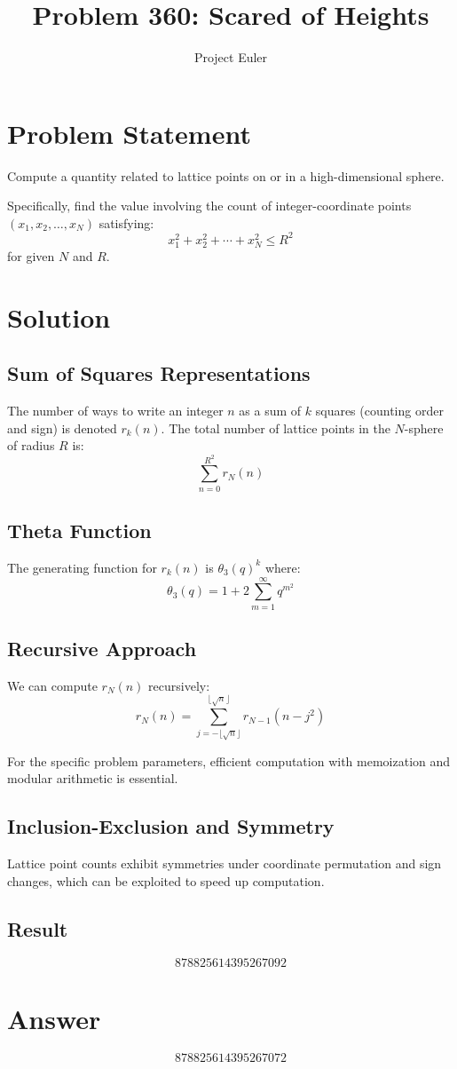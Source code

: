 \documentclass{article}
\title{Problem 360: Scared of Heights}
\author{Project Euler}
\date{}
\begin{document}
\maketitle

\section{Problem Statement}
Compute a quantity related to lattice points on or in a high-dimensional sphere.

Specifically, find the value involving the count of integer-coordinate points
$(x_1, x_2, \ldots, x_N)$ satisfying:
\[
x_1^2 + x_2^2 + \cdots + x_N^2 \leq R^2
\]
for given $N$ and $R$.

\section{Solution}

\subsection{Sum of Squares Representations}
The number of ways to write an integer $n$ as a sum of $k$ squares (counting order
and sign) is denoted $r_k(n)$. The total number of lattice points in the $N$-sphere
of radius $R$ is:
\[
\sum_{n=0}^{R^2} r_N(n)
\]

\subsection{Theta Function}
The generating function for $r_k(n)$ is $\theta_3(q)^k$ where:
\[
\theta_3(q) = 1 + 2\sum_{m=1}^{\infty} q^{m^2}
\]

\subsection{Recursive Approach}
We can compute $r_N(n)$ recursively:
\[
r_N(n) = \sum_{j=-\lfloor\sqrt{n}\rfloor}^{\lfloor\sqrt{n}\rfloor} r_{N-1}(n - j^2)
\]

For the specific problem parameters, efficient computation with memoization
and modular arithmetic is essential.

\subsection{Inclusion-Exclusion and Symmetry}
Lattice point counts exhibit symmetries under coordinate permutation and sign changes,
which can be exploited to speed up computation.

\subsection{Result}
\[
\boxed{878825614395267092}
\]

\section{Answer}

\[
\boxed{878825614395267072}
\]
\end{document}
